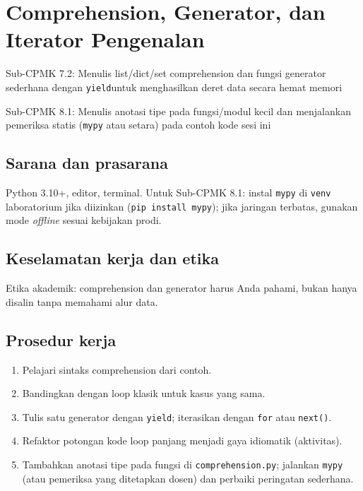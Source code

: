\documentclass[../main.tex]{subfiles}
\begin{document}
\chapter{Comprehension, Generator, dan Iterator Pengenalan}

\begin{subcpmk}
  \item Sub-CPMK 7.2: Menulis list/dict/set comprehension dan fungsi generator sederhana dengan \texttt{yield}\newline untuk menghasilkan deret data secara hemat memori
  \item Sub-CPMK 8.1: Menulis anotasi tipe pada fungsi/modul kecil dan menjalankan pemeriksa statis (\texttt{mypy} atau setara) pada contoh kode sesi ini
\end{subcpmk}


\section{Sarana dan prasarana}

Python 3.10+, editor, terminal. Untuk Sub-CPMK 8.1: instal \texttt{mypy} di \texttt{venv} laboratorium jika diizinkan (\texttt{pip install mypy}); jika jaringan terbatas, gunakan mode \textit{offline} sesuai kebijakan prodi.

\section{Keselamatan kerja dan etika}

Etika akademik: comprehension dan generator harus Anda pahami, bukan hanya disalin tanpa memahami alur data.

\section{Prosedur kerja}

\begin{enumerate}[leftmargin=*]
  \item Pelajari sintaks comprehension dari contoh.
  \item Bandingkan dengan loop klasik untuk kasus yang sama.
  \item Tulis satu generator dengan \texttt{yield}; iterasikan dengan \texttt{for} atau \texttt{next()}.
  \item Refaktor potongan kode loop panjang menjadi gaya idiomatik (aktivitas).
  \item Tambahkan anotasi tipe pada fungsi di \texttt{comprehension.py}; jalankan \texttt{mypy} (atau pemeriksa yang ditetapkan dosen) dan perbaiki peringatan sederhana.
\end{enumerate}
\end{document}
